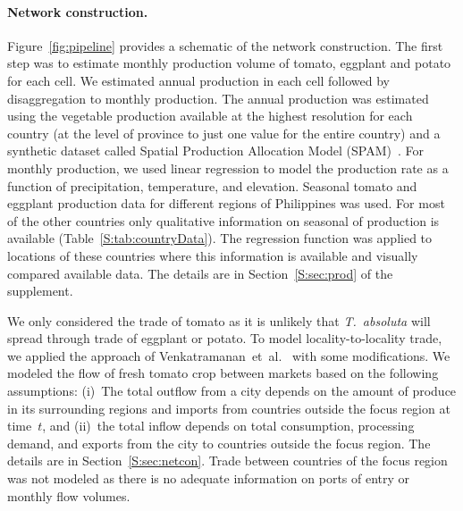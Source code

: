 \documentclass[11pt]{article}
\newcommand{\tuta}{\emph{T.~absoluta}}
\theoremstyle{definition}
\begin{document}
\paragraph{Network construction.} 
Figure~\ref{fig:pipeline} provides a schematic of the network construction.
The first step was to estimate monthly production volume of tomato,
eggplant and potato for each cell. We estimated annual production in each
cell followed by disaggregation to monthly production. The annual
production was estimated using the vegetable production available at the
highest resolution for each country (at the level of province to just one
value for the entire country) and a synthetic dataset called Spatial
Production Allocation Model (SPAM)~\cite{spam}. For monthly production, we
used linear regression to model the production rate as a function of
precipitation, temperature, and elevation. Seasonal tomato and eggplant
production data for different regions of Philippines was used. For most of
the other countries only qualitative information on seasonal of production
is available (Table~\ref{S:tab:countryData}). The regression function was
applied to locations of these countries where this information is
available and visually compared available data. The details are in
Section~\ref{S:sec:prod} of the supplement.

We only considered the trade of tomato as it is unlikely that
\tuta{} will spread through trade of eggplant or potato.
To model locality-to-locality trade, we applied the approach
of
Venkatramanan~et~al.~\cite{venkatramanan2017towards,venkatramanan2019modeling}
with some modifications. We modeled the
flow of fresh tomato crop between markets based on the following
assumptions: (i)~The total outflow from a city depends on the amount of
produce in its surrounding regions and imports from countries outside the
focus region at time~$t$, and (ii)~the total inflow depends on total
consumption, processing demand, and exports from the city to countries
outside the focus region. The details are in Section~\ref{S:sec:netcon}.
Trade between countries of the focus
region was not modeled as there is no adequate information on ports of
entry or monthly flow volumes.
\end{document}
